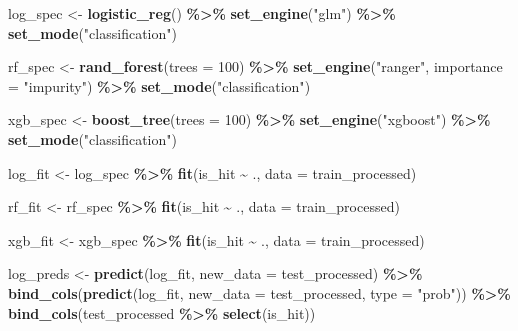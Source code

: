 \documentclass[
]{article}
\newenvironment{Shaded}{\begin{snugshade}}{\end{snugshade}}
\newcommand{\AttributeTok}[1]{\textcolor[rgb]{0.13,0.29,0.53}{#1}}
\newcommand{\DecValTok}[1]{\textcolor[rgb]{0.00,0.00,0.81}{#1}}
\newcommand{\FunctionTok}[1]{\textcolor[rgb]{0.13,0.29,0.53}{\textbf{#1}}}
\newcommand{\NormalTok}[1]{#1}
\newcommand{\OtherTok}[1]{\textcolor[rgb]{0.56,0.35,0.01}{#1}}
\newcommand{\SpecialCharTok}[1]{\textcolor[rgb]{0.81,0.36,0.00}{\textbf{#1}}}
\newcommand{\StringTok}[1]{\textcolor[rgb]{0.31,0.60,0.02}{#1}}
\begin{document}
\begin{Shaded}
\begin{Highlighting}[]
\NormalTok{log\_spec }\OtherTok{\textless{}{-}} \FunctionTok{logistic\_reg}\NormalTok{() }\SpecialCharTok{\%\textgreater{}\%}
  \FunctionTok{set\_engine}\NormalTok{(}\StringTok{"glm"}\NormalTok{) }\SpecialCharTok{\%\textgreater{}\%}
  \FunctionTok{set\_mode}\NormalTok{(}\StringTok{"classification"}\NormalTok{)}

\NormalTok{rf\_spec }\OtherTok{\textless{}{-}} \FunctionTok{rand\_forest}\NormalTok{(}\AttributeTok{trees =} \DecValTok{100}\NormalTok{) }\SpecialCharTok{\%\textgreater{}\%}
  \FunctionTok{set\_engine}\NormalTok{(}\StringTok{"ranger"}\NormalTok{, }\AttributeTok{importance =} \StringTok{"impurity"}\NormalTok{) }\SpecialCharTok{\%\textgreater{}\%}
  \FunctionTok{set\_mode}\NormalTok{(}\StringTok{"classification"}\NormalTok{)}

\NormalTok{xgb\_spec }\OtherTok{\textless{}{-}} \FunctionTok{boost\_tree}\NormalTok{(}\AttributeTok{trees =} \DecValTok{100}\NormalTok{) }\SpecialCharTok{\%\textgreater{}\%}
  \FunctionTok{set\_engine}\NormalTok{(}\StringTok{"xgboost"}\NormalTok{) }\SpecialCharTok{\%\textgreater{}\%}
  \FunctionTok{set\_mode}\NormalTok{(}\StringTok{"classification"}\NormalTok{)}

\NormalTok{log\_fit }\OtherTok{\textless{}{-}}\NormalTok{ log\_spec }\SpecialCharTok{\%\textgreater{}\%}
  \FunctionTok{fit}\NormalTok{(is\_hit }\SpecialCharTok{\textasciitilde{}}\NormalTok{ ., }\AttributeTok{data =}\NormalTok{ train\_processed)}

\NormalTok{rf\_fit }\OtherTok{\textless{}{-}}\NormalTok{ rf\_spec }\SpecialCharTok{\%\textgreater{}\%}
  \FunctionTok{fit}\NormalTok{(is\_hit }\SpecialCharTok{\textasciitilde{}}\NormalTok{ ., }\AttributeTok{data =}\NormalTok{ train\_processed)}

\NormalTok{xgb\_fit }\OtherTok{\textless{}{-}}\NormalTok{ xgb\_spec }\SpecialCharTok{\%\textgreater{}\%}
  \FunctionTok{fit}\NormalTok{(is\_hit }\SpecialCharTok{\textasciitilde{}}\NormalTok{ ., }\AttributeTok{data =}\NormalTok{ train\_processed)}

\NormalTok{log\_preds }\OtherTok{\textless{}{-}} \FunctionTok{predict}\NormalTok{(log\_fit, }\AttributeTok{new\_data =}\NormalTok{ test\_processed) }\SpecialCharTok{\%\textgreater{}\%}
  \FunctionTok{bind\_cols}\NormalTok{(}\FunctionTok{predict}\NormalTok{(log\_fit, }\AttributeTok{new\_data =}\NormalTok{ test\_processed, }\AttributeTok{type =} \StringTok{"prob"}\NormalTok{)) }\SpecialCharTok{\%\textgreater{}\%}
  \FunctionTok{bind\_cols}\NormalTok{(test\_processed }\SpecialCharTok{\%\textgreater{}\%} \FunctionTok{select}\NormalTok{(is\_hit))}


\end{Highlighting}
\end{Shaded}
\end{document}
